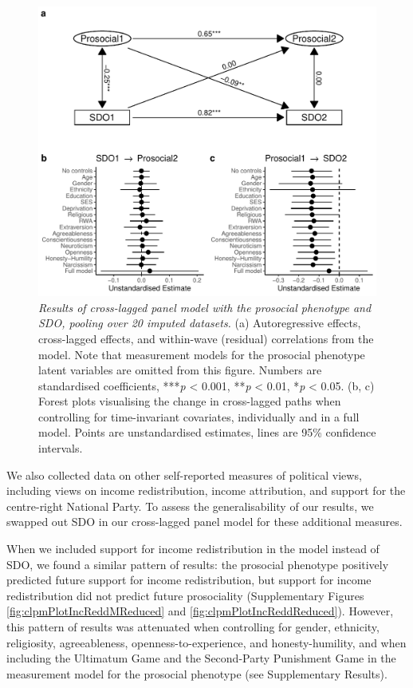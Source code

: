 \documentclass[
  man,floatsintext]{apa6}
\begin{document}
\begin{figure}
\centering
\includegraphics{manuscript_files/figure-latex/clpmPlotSDOdMReduced-1.pdf}
\caption{\label{fig:clpmPlotSDOdMReduced}\emph{Results of cross-lagged panel model with the
prosocial phenotype and SDO, pooling over 20 imputed datasets.} (a)
Autoregressive effects, cross-lagged effects, and within-wave (residual)
correlations from the model. Note that measurement models for the prosocial
phenotype latent variables are omitted from this figure. Numbers are
standardised coefficients, ***\emph{p} \textless{} 0.001, **\emph{p} \textless{} 0.01, *\emph{p} \textless{} 0.05.
(b, c) Forest plots visualising the change in cross-lagged paths when
controlling for time-invariant covariates, individually and in a full model.
Points are unstandardised estimates, lines are 95\% confidence intervals.}
\end{figure}

We also collected data on other self-reported measures of political views,
including views on income redistribution, income attribution, and support for
the centre-right National Party. To assess the generalisability of our results,
we swapped out SDO in our cross-lagged panel model for these additional
measures.

When we included support for income redistribution in the model instead of SDO,
we found a similar pattern of results: the prosocial phenotype positively
predicted future support for income redistribution, but support for income
redistribution did not predict future prosociality
(Supplementary Figures \ref{fig:clpmPlotIncReddMReduced} and
\ref{fig:clpmPlotIncReddReduced}). However, this pattern of results was
attenuated when controlling for gender, ethnicity, religiosity, agreeableness,
openness-to-experience, and honesty-humility, and when including the Ultimatum
Game and the Second-Party Punishment Game in the measurement model for the
prosocial phenotype (see Supplementary Results).
\end{document}
